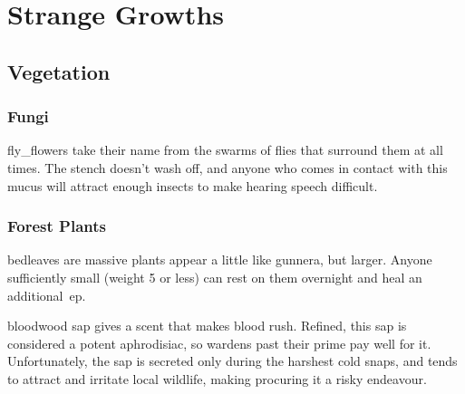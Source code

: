 \chapter{Strange Growths}
\label{growths}

\section[Vegetation]{Vegetation~}
\label{vegetation}

\begin{multicols}{2}
\renewcommand\npcsymbol{\glsentrysymbol{plant}}

\subsection{Fungi}
\label{fungi}
\setcounter{encnum}{7}

%
  {}%
  {}%

%
  {}%
  {}%

%
  {fly_flowers}%
  {take their name from the swarms of flies that surround them at all times.
  The stench doesn't wash off, and anyone who comes in contact with this mucus will attract enough insects to make hearing speech difficult.}%

%
  {}%
  {}

%
  {}%
  {}


\subsection{Forest Plants}
\label{plants}
\setcounter{encnum}{0}

%
  {bedleaves}%
  {are massive plants appear a little like gunnera, but larger.
  Anyone sufficiently small (\gls{weight} 5 or less) can rest on them overnight and heal an additional~\gls{ep}.}%

%
  {bloodwood}%
  {sap gives a scent that makes blood rush.
  Refined, this sap is considered a potent aphrodisiac, so \glspl{warden} past their prime pay well for it.
  Unfortunately, the sap is secreted only during the harshest cold snaps, 
  and tends to attract and irritate local wildlife, making procuring it a risky endeavour.
  }

%
  {}%
  {}

%
  {}%
  {}


\end{multicols}
